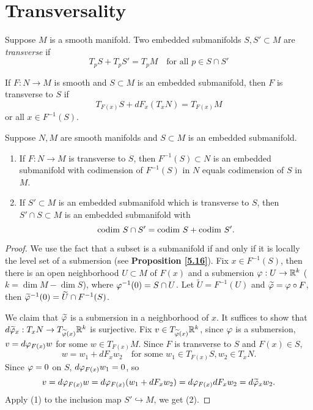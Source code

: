 \section{Transversality}
\begin{definition}
    Suppose $M$ is a smooth manifold. Two embedded submanifolds $S,S' \subset M$ are \textit{transverse} if 
    $$T_pS + T_pS' = T_p M \quad \text{for all }p \in S \cap S' $$
\end{definition}
\begin{definition}
    If $F:N \to M$ is smooth and $S \subset M$ is an embedded submanifold, then $F$ is transverse to $S$ if 
    $$T_{F(x)}S + dF_x(T_xN) = T_{F(x)}M $$ or all $x \in F^{-1}(S)$. 
\end{definition}
\begin{theorem}
    Suppose $N,M$ are smooth manifolds and $S \subset M$ is an embedded submanifold.
    \begin{enumerate}
    \item If $F:N \to M$ is transverse to $S$, then $F^{-1}(S) \subset N$ is an embedded submanifold with codimension of $F^{-1}(S)$ in $N$ equals codimension of $S$ in $M$. 
    \item If $S' \subset M$ is an embedded submanifold which is transverse to $S$, then $S' \cap S \subset M$ is an embedded submanifold with 
    $$ \mathrm{codim~} S \cap S' = \mathrm{codim~} S + \mathrm{codim~} S'. $$
    \end{enumerate}
\end{theorem}
\begin{proof}
    We use the fact that a subset is a submanifold if and only if it is locally the level set of a submersion (see \textbf{Proposition \ref{5.16}}). 
    Fix $x \in F^{-1}(S)$, then there is an open neighborhood $U \subset M$ of $F(x)$ and a submersion $\varphi:U \to \mathbb{R}^k$ ($k=\dim M - \dim S$), where $\varphi^{-1}(0) = S \cap U$. Let $\widetilde{U}=F^{-1}(U)$ and $\widetilde{\varphi} = \varphi \circ F$, then $\widetilde{\varphi}^{-1}(0) = \widetilde{U} \cap F^{-1}(S)$. 
    
    We claim that $\widetilde{\varphi}$ is a submersion in a neighborhood of $x$. It suffices to show that $d\widetilde{\varphi}_x:T_xN \to T_{\widetilde{\varphi}(x)}\mathbb{R}^k$ is surjective. Fix $v \in T_{\widetilde{\varphi}(x)}\mathbb{R}^k$, since $\varphi$ is a submersion, $v = d\varphi_{F(x)} w$ for some $w \in T_{F(x)}M$. Since $F$ is transverse to $S$ and $F(x) \in S$, 
    $$w = w_1 + dF_x w_2 \quad \text{for some }w_1 \in T_{F(x)}S, w_2 \in T_xN. $$
    Since $\varphi = 0$ on $S$, $d\varphi_{F(x)}w_1 = 0$, so 
    $$v = d\varphi_{F(x)}w = d\varphi_{F(x)}(w_1 + dF_x w_2) = d\varphi_{F(x)}dF_x w_2 = d\widetilde{\varphi}_x w_2.$$
    Apply (1) to the inclusion map $S' \hookrightarrow M$, we get (2). 
\end{proof}
